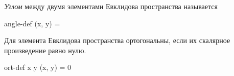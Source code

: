 
\begin{definition}
  \textit{Углом} между двумя элементами Евклидова пространства называется
  \begin{lequation}{angle-def}
    \cos \angle (x, y) = 
  \end{lequation}
\end{definition}

\begin{definition}
  Для элемента Евклидова пространства ортогональны, если их скалярное
  произведение равно нулю.
  \begin{lequation}{ort-def}
    x \bot y \iff (x, y) = 0
  \end{lequation}
\end{definition}

